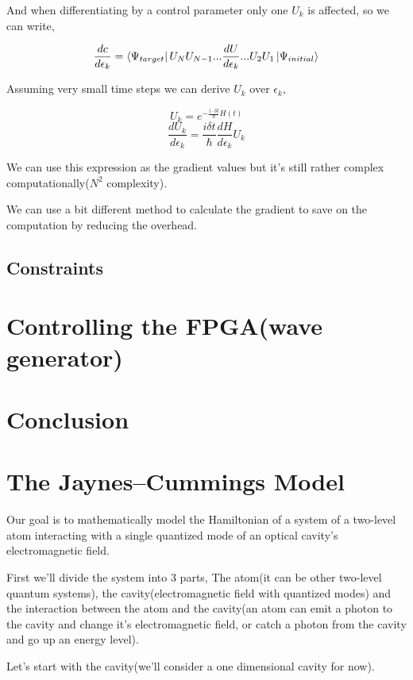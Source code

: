 \documentclass{article}
\numberwithin{equation}{section} %
\begin{document}
And when differentiating by a control parameter only one $U_k$ is affected, so we can write,

$$\frac{dc}{d\epsilon_k} = \bra{\Psi_{target}}U_N U_{N-1}...\frac{dU}{d\epsilon_k}...U_2 U_1\ket{\Psi_{initial}} $$

Assuming very small time steps we can derive $U_k$ over $\epsilon_k$,

$$U_k = e^{-\frac{i\cdot \delta t}{\hbar}H(t)}$$
$$\frac{dU_k}{d\epsilon_k} = \frac{i \delta t}{\hbar}\frac{dH}{d\epsilon_k} U_k$$

We can use this expression as the gradient values but it's still rather complex computationally($N^2$ complexity).\par
We can use a bit different method to calculate the gradient to save on the computation by reducing the overhead.


\subsection{Constraints}

\newpage
\section{Controlling the FPGA(wave generator)}
\newpage
\section{Conclusion}


\newpage

\appendix
\section{The Jaynes–Cummings Model}
Our goal is to mathematically model the Hamiltonian of a system of a two-level atom interacting with a single quantized mode of an optical cavity's electromagnetic field. %
\par
First we'll divide the system into 3 parts, The atom(it can be other two-level quantum systems), the cavity(electromagnetic field with quantized modes) and the interaction between the atom and the cavity(an atom can emit a photon to the cavity and change it's electromagnetic field, or catch a photon from the cavity and go up an energy level).\par  %
Let's start with the cavity(we'll consider a one dimensional cavity for now). 
\end{document}
